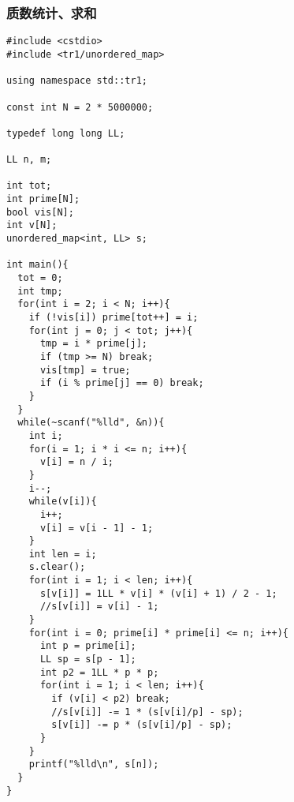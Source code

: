 \subsubsection{质数统计、求和}
\begin{verbatim}
#include <cstdio>
#include <tr1/unordered_map>

using namespace std::tr1;

const int N = 2 * 5000000;

typedef long long LL;

LL n, m;

int tot;
int prime[N];
bool vis[N];
int v[N];
unordered_map<int, LL> s;

int main(){
  tot = 0;
  int tmp;
  for(int i = 2; i < N; i++){
    if (!vis[i]) prime[tot++] = i;
    for(int j = 0; j < tot; j++){
      tmp = i * prime[j];
      if (tmp >= N) break;
      vis[tmp] = true;
      if (i % prime[j] == 0) break;
    }
  }
  while(~scanf("%lld", &n)){
    int i;
    for(i = 1; i * i <= n; i++){
      v[i] = n / i;
    }
    i--;
    while(v[i]){
      i++;
      v[i] = v[i - 1] - 1;
    }
    int len = i;
    s.clear();
    for(int i = 1; i < len; i++){
      s[v[i]] = 1LL * v[i] * (v[i] + 1) / 2 - 1;
      //s[v[i]] = v[i] - 1;
    }
    for(int i = 0; prime[i] * prime[i] <= n; i++){
      int p = prime[i];
      LL sp = s[p - 1];
      int p2 = 1LL * p * p;
      for(int i = 1; i < len; i++){
        if (v[i] < p2) break;
        //s[v[i]] -= 1 * (s[v[i]/p] - sp);
        s[v[i]] -= p * (s[v[i]/p] - sp);
      }
    }
    printf("%lld\n", s[n]);
  }
}
\end{verbatim}
